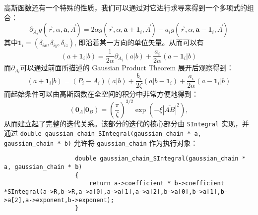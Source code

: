 \documentclass[12pt,a4paper,openany,twoside]{article}
\numberwithin{equation}{section}
\begin{document}
                高斯函数还有一个特殊的性质，我们可以通过对它进行求导来得到一个多项式的组合：
                \begin{equation}
                    \partial_{A_i} g(\vec{r},\alpha,\boldsymbol{a},\vec{A}) = 2 \alpha g(\vec{r},\alpha,\boldsymbol{a} + \boldsymbol{1}_i,\vec{A}) - a_i g(\vec{r},\alpha,\boldsymbol{a} - \boldsymbol{1}_i,\vec{A})
                \end{equation}
                其中$\boldsymbol{1}_i = (\delta_{ix},\delta_{iy},\delta_{iz})$, 即沿着某一方向的单位矢量。从而可以有
                \begin{equation}
                    (a+\boldsymbol{1}_i|b) = \frac{1}{2\alpha} \partial_{A_i} (a|b) + \frac{a_i}{2\alpha} (a-\boldsymbol{1}_i|b)
                \end{equation}
                而$\partial_{A_i}$可以通过前面所描述的 Gaussian Product Theorem 展开后观察得到：
                \begin{equation}
                    (a+\boldsymbol{1}_i|b) = (P_i - A_i)(a|b) +  \frac{b_i}{2\zeta} (a|b-\boldsymbol{1}_i) + \frac{a_i}{2\alpha} (a-\boldsymbol{1}_i|b)
                \end{equation}
                而起始条件可以由高斯函数在全空间的积分中非常方便地得到：
                \begin{equation}
                    (\boldsymbol{0}_A|\boldsymbol{0}_B) = \left(\frac{\pi}{\zeta}\right)^{3/2} \exp(- \xi |\bar{AB}|^2),
                \end{equation}
                从而建立起了完整的迭代关系。该部分的迭代的核心部分由 \lstinline$SIntegral$ 实现，并通过 \lstinline$double gaussian_chain_SIntegral(gaussian_chain * a, gaussian_chain * b)$ 允许将 \lstinline$gaussian_chain$ 作为执行对象：
                \begin{lstlisting}
                    double gaussian_chain_SIntegral(gaussian_chain * a, gaussian_chain * b)
                    {
                        return a->coefficient * b->coefficient *SIntegral(a->R,b->R,a->a[0],a->a[1],a->a[2],b->a[0],b->a[1],b->a[2],a->exponent,b->exponent);
                    }
                \end{lstlisting}
                
\end{document}
